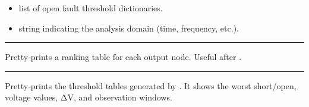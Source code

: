 \documentclass[letterpaper,10pt,english]{sphinxmanual}
\begin{document}
\begin{fulllineitems}
\begin{itemize}
\item {} 
\sphinxAtStartPar
{}  \textendash{} list of open fault threshold dictionaries.

\item {} 
\sphinxAtStartPar
{} \textendash{} string indicating the analysis domain (time, frequency, etc.).

\end{itemize}

\end{fulllineitems}



\bigskip\hrule\bigskip


\begin{fulllineitems}
\label{\detokenize{fault_analysis:print_fault_table}}
\pysigstartsignatures
\pysiglinewithargsret
{}
{\sphinxparamcomma {}}
{}
\pysigstopsignatures
\sphinxAtStartPar
Pretty‑prints a ranking table for each output node.  Useful after
{\hyperref[\detokenize{fault_analysis:perform_global_ranking}]{}}.

\end{fulllineitems}



\bigskip\hrule\bigskip


\begin{fulllineitems}
\label{\detokenize{fault_analysis:print_threshold_table}}
\pysigstartsignatures
\pysiglinewithargsret
{}
{}
{}
\pysigstopsignatures
\sphinxAtStartPar
Pretty‑prints the threshold tables generated by
.  It shows the worst short/open,
voltage values, ΔV, and observation windows.

\end{fulllineitems}
\end{document}
